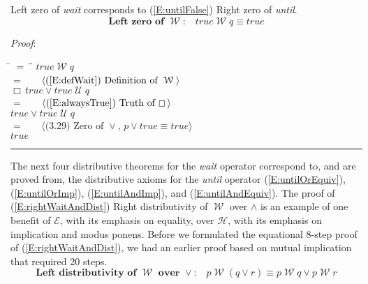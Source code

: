 \documentclass[12pt, fleqn, leqno]{article}
\newcommand{\lgap}{2pt}                             %
\newcommand{\mymathindent}{24pt}                    %
\newcommand{\Until}{\;\mathcal{U}\;}
\newcommand{\Wait}{\;\mathcal{W}\;}
\newcommand{\Always}{\Box\,}
\newcommand{\myqed}{\rule[-.23ex]{1.2ex}{2.0ex}}
\newcommand{\myqedtab}{\hspace{384pt}}              %
\newcommand{\Gll} {\langle}                         %
\newcommand{\Ggg} {\rangle}                         %
\newcommand{\Hint}[1]     {\ \ \ $\Gll              \mbox{#1} \Ggg$ }   %
\begin{document}
Left zero of \textit{wait} corresponds to (\ref{E:untilFalse}) Right zero of \textit{until}.
\begin{equation}\label{E:leftZeroWait}
\textbf{Left zero of $\Wait$:}\quad true \Wait q \equiv true
\end{equation}

\emph{Proof}:
\begin{tabbing}
\hspace{\mymathindent} \= $= \;$ \= \myqedtab \= \kill
\> \> $true \Wait q$\\[\lgap]
\> $=$ \> \Hint{(\ref{E:defWait}) Definition of $\Wait$} \\[\lgap]
\> \> $\Always true \lor true\Until q$\\[\lgap]
\> $=$ \> \Hint{(\ref{E:alwaysTrue}) Truth of $\Always$} \\[\lgap]
\> \> $true \lor true\Until q$\\[\lgap]
\> $=$ \> \Hint{(3.29) Zero of $\lor$, $p\lor true \equiv true$}\\[\lgap]
\> \> $true$ \quad \myqed
\end{tabbing}

The next four distributive theorems for the \textit{wait} operator correspond to, and are proved from,
the distributive axioms for the \textit{until} operator
(\ref{E:untilOrEquiv}), (\ref{E:untilOrImp}), (\ref{E:untilAndImp}), and (\ref{E:untilAndEquiv}).
The proof of (\ref{E:rightWaitAndDist}) Right distributivity of $\Wait$ over $\land$ is an example of one benefit of $\mathcal{E}$, with its emphasis on equality, over $\mathcal{H}$, with its emphasis on implication and modus ponens.
Before we formulated the equational 8-step proof of (\ref{E:rightWaitAndDist}), we had an earlier proof based on mutual implication that required 20 steps.
\begin{equation}\label{E:waitOrDist}
\textbf{Left distributivity of $\Wait$ over $\lor$:}\quad p \Wait (q \lor r) \equiv p \Wait q \lor p \Wait r
\end{equation}
\end{document}
